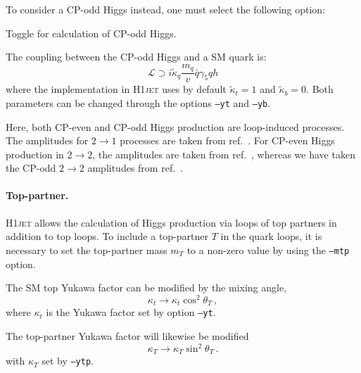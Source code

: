 \documentclass[12pt]{article}
\begin{document}
\noindent
To consider a CP-odd Higgs instead, one must select the following option: 
\begin{description}[labelindent=1cm, labelwidth =\widthof{\bfseries9999999999999999999999}, leftmargin = !] 
	\item[\texttt{--cpodd}] Toggle for calculation of CP-odd Higgs. 
\end{description}
The coupling between the CP-odd Higgs and a SM quark is: 
\begin{equation}
   \mathcal{L} \supset i \tilde{\kappa}_q \frac{m_q}{v} \bar{q} \gamma_5 q h
\end{equation}
where the implementation in \textsc{H1jet} uses by default $\tilde{\kappa}_t = 1$ and $\tilde{\kappa}_b = 0$. Both parameters can be changed through the options \texttt{--yt} and \texttt{--yb}.

Here, both CP-even and CP-odd Higgs production are loop-induced
processes. The amplitudes for $2\to 1$ processes are taken
from ref.~\cite{Spira:1995rr}. For CP-even Higgs production in $2\to 2$,
the amplitudes are taken from ref.~\cite{Baur:1989cm}, whereas we have
taken the CP-odd $2\to 2$ amplitudes from ref.~\cite{Grojean:2013nya}.

\paragraph{Top-partner.} \textsc{H1jet} allows the calculation of
Higgs production via loops of top partners in addition to top loops.
To include a top-partner $T$ in the quark loops, it is necessary
to set the top-partner mass $m_T$ to a non-zero value by using the
\texttt{--mtp} option.

The SM top Yukawa factor can be modified by the mixing angle, 
\begin{equation}
   \kappa_t \rightarrow \kappa_t \cos^2\theta_T \,, 
\end{equation} 
where $\kappa_t$ is the Yukawa factor set by option \texttt{--yt}. 

The top-partner Yukawa factor will likewise be modified 
\begin{equation}
   \kappa_T \rightarrow \kappa_T \sin^2\theta_T \,. 
\end{equation} 
with $\kappa_T$ set by \texttt{--ytp}.
\end{document}

